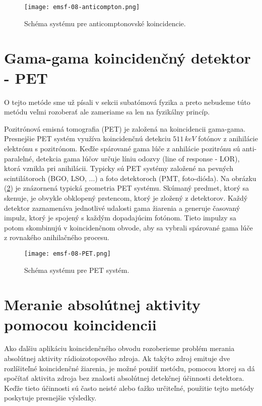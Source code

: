 \documentclass[../../main.tex]{subfiles}
\begin{document}
\begin{figure}[!h]
\texttt{[image: emsf-08-anticompton.png]}
\centering
\caption{Schéma systému pre anticomptonovské koincidencie.}
\label{em8:fig:anticomton}
\end{figure}

\section{Gama-gama koincidenčný detektor - PET}
O tejto metóde sme už písali v sekcii subatómová fyzika a preto nebudeme túto metódu veľmi rozoberať ale zameriame sa len na fyzikálny princíp.

Pozitrónová emisná tomografia (PET) je založená na koincidencii gama-gama. Presnejšie PET systém využíva koincidenčnú detekciu $511\,keV$ fotónov z anihilácie elektrónu s pozitrónom. Keďže spárované gama lúče z anhilácie pozitrónu sú anti-paralelné, detekcia gama lúčov určuje líniu odozvy (line of response - LOR), ktorá vznikla pri anihilácii. Typicky sú PET systémy založené na pevných scintilátoroch (BGO, LSO, ...) a foto detektoroch (PMT, foto-dióda). Na obrázku (\ref{em8:fig:PET}) je znázornená typická geometria PET systému. Skúmaný predmet, ktorý sa skenuje, je obvykle obklopený prstencom, ktorý je zložený z detektorov. Každý detektor zaznamenáva jednotlivé udalosti gama žiarenia a generuje časovaný impulz, ktorý je spojený s každým dopadajúcim fotónom. Tieto impulzy sa potom skombinujú v koincidenčnom obvode, aby sa vybrali spárované gama lúče z rovnakého anihilačného procesu.

\begin{figure}[!h]
\texttt{[image: emsf-08-PET.png]}
\centering
\caption{Schéma systému pre PET systém.}
\label{em8:fig:PET}
\end{figure}

\section{Meranie absolútnej aktivity pomocou koincidencii}
Ako ďalšiu aplikáciu koincidenčného obvodu rozoberieme problém merania absolútnej aktivity rádioizotopového zdroja. Ak takýto zdroj emituje dve rozlíšiteľné koincidenčné žiarenia, je možné použiť metódu, pomocou ktorej sa dá spočítať aktivita zdroja bez znalosti absolútnej detekčnej účinnosti detektora. Keďže tieto účinnosti sú často neisté alebo ťažko určiteľné, použitie tejto metódy poskytuje presnejšie výsledky. 
\end{document}
